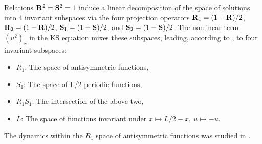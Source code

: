 Relations $\mathbf{R}^2=\mathbf{S}^2=1$
induce a linear decomposition of the space of solutions into 4 invariant
subspaces via the four projection operators
$\mathbf{R}_1=(1+\mathbf{R})/2$,
$\mathbf{R}_2=(1-\mathbf{R})/2$,
$\mathbf{S}_1=(1+\mathbf{S})/2$, and
$\mathbf{S}_2=(1-\mathbf{S})/2$. The nonlinear term $(u^2)_x$ in the KS equation
mixes these subspaces, leading,
according to , to four invariant subspaces:
\begin{itemize}
 \item $R_1$: The space of antisymmetric functions,
 \item $S_1$: The space of L/2 periodic functions,
 \item $R_1 S_1$: The intersection of the above two,
 \item $L$: The space of functions invariant under $x\mapsto L/2-x,\ u\mapsto -u$.
 
\end{itemize}
The dynamics within the $R_1$ space of antisymmetric functions
was studied in .

